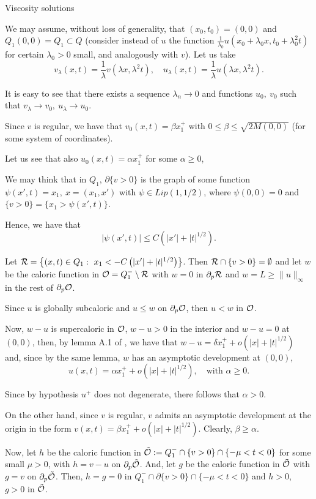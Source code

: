 \begin{section}{Viscosity solutions}
\begin{pf}
We may assume, without loss of generality, that $(x_0,t_0)=(0,0)$ and
$Q_1(0,0)=Q_1\subset Q$ (consider instead of $u$ the function
$\frac{1}{\lambda_0}u(x_0+\lambda_0 x,t_0+\lambda_0^2 t)$ for certain $\lambda_0>0$
small, and analogously with $v$). Let us take
$$v_{\lambda}(x,t)=\frac{1}{\lambda}v(\lambda x,\lambda^2 t),\quad 
u_{\lambda}(x,t)=\frac{1}{\lambda}u(\lambda x,\lambda^2 t).$$

It is easy to see that there exists a sequence $\lambda_n\to 0$ and functions 
$u_0,\ v_0$ such that $v_{\lambda}\to v_0,\ u_{\lambda}\to u_0$.

Since $v$ is regular, we have that $v_0(x,t)=\beta x_1^+$ with 
$0\le\beta\le\sqrt{2M(0,0)}$ (for some system of coordinates).

Let us see that also $u_0(x,t)=\alpha x_1^+$ for some $\alpha\ge0$, 

We may think that in $Q_1$,  $\partial\{v>0\}$ is the graph of some function 
$\psi(x',t)=x_1,\ x=(x_1,x')$ with $\psi\in Lip(1,1/2)$, where $\psi(0,0)=0$ 
and $\{ v>0 \} = \{ x_1>\psi(x',t) \}$.

Hence, we have that
$$|\psi(x',t)|\le C\left(|x'| + |t|^{1/2}\right).$$

Let  ${\cal R}=\left\{(x,t)\in Q_1:\ x_1<-C\left(|x'| + 
|t|^{1/2}\right)\right\}$. Then ${\cal R}\cap\{ v>0 \}=\emptyset$ and let 
$w$ be the caloric function in ${\cal O}=Q_1^-\setminus {\cal R}$ with $w=0$ 
in $\partial_p{\cal R}$ and $w=L\ge\|u\|_{\infty}$ in the rest of
$\partial_p{\cal O}$.

Since $u$ is globally subcaloric and $u\le w$ on $\partial_p{\cal O}$, 
then $u < w$ in ${\cal O}$.

Now, $w-u$ is supercaloric in ${\cal O}$, $w-u>0$ in the interior and 
$w-u=0$ at $(0,0)$, then, by lemma A.1 of \cite{CLW1}, we have that 
$w-u=\delta x_1^+ + o(|x|+|t|^{1/2})$ and, since by the same lemma, $w$ has 
an asymptotic development at $(0,0)$, 
$$u(x,t)=\alpha x_1^+ + o(|x|+|t|^{1/2}),\quad \mbox{with } \alpha\ge0.$$

Since by hypothesis $u^+$ does not degenerate, there follows that $\alpha>0$.

On the other hand, since $v$ is regular, $v$ admits an asymptotic development 
at the origin in the form $v(x,t)=\beta x_1^+ + o(|x|+|t|^{1/2})$. Clearly, 
$\beta\ge \alpha$.

Now, let $h$ be the caloric function in $\tilde {\cal O}:=
Q_1^-\cap\{ v>0 \}\cap\{-\mu<t<0\}$ for some small $\mu>0$,  with $h=v-u$
on $\partial_p\tilde{\cal O}$. And, let $g$ be the caloric function
in $\tilde{\cal O}$ with $g=v$ on $\partial_p\tilde{\cal O}$. 
Then, $h=g=0$ in $Q_1^-\cap\partial
\{ v>0 \}\cap\{-\mu<t<0\}$ and $h>0$, $g>0$ in $\tilde{\cal O}$.


\end{pf}
\end{section}
